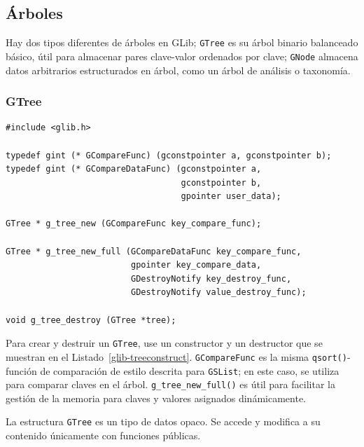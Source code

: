 \subsection{Árboles}

Hay dos tipos diferentes de árboles en GLib; \lstinline{GTree} es su árbol binario balanceado básico, útil para almacenar pares clave-valor ordenados por clave; \lstinline{GNode} almacena datos arbitrarios estructurados en árbol, como un árbol de análisis o taxonomía.

\subsubsection{GTree}

\begin{lstlisting}[style=GLib/GTK, caption={Creando y destruyendo árboles binarios balanceados}, label=glib-treeconstruct]
#include <glib.h>

typedef gint (* GCompareFunc) (gconstpointer a, gconstpointer b);
typedef gint (* GCompareDataFunc) (gconstpointer a,
                                   gconstpointer b,
                                   gpointer user_data);

GTree * g_tree_new (GCompareFunc key_compare_func);

GTree * g_tree_new_full (GCompareDataFunc key_compare_func,
                         gpointer key_compare_data,
                         GDestroyNotify key_destroy_func,
                         GDestroyNotify value_destroy_func);

void g_tree_destroy (GTree *tree);
\end{lstlisting}

Para crear y destruir un \lstinline{GTree}, use un constructor y un destructor que se muestran en el Listado~\ref{glib-treeconstruct}. \lstinline{GCompareFunc} es la misma \lstinline{qsort()}-función de comparación de estilo descrita para \lstinline{GSList}; en este caso, se utiliza para comparar claves en el árbol. \lstinline{g_tree_new_full()} es útil para facilitar la gestión de la memoria para claves y valores asignados dinámicamente.

La estructura \lstinline{GTree} es un tipo de datos opaco. Se accede y modifica a su contenido únicamente con funciones públicas.

